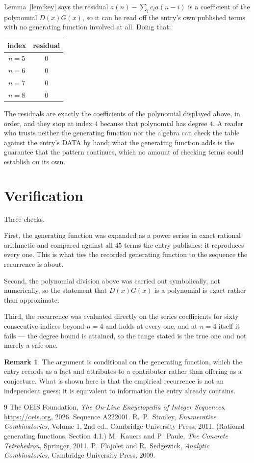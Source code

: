 \documentclass[11pt,a4paper]{article}
\theoremstyle{plain}
\theoremstyle{definition}
\newtheorem{remark}[theorem]{Remark}
\begin{document}
Lemma~\ref{lem:key} says the residual $a(n)-\sum_ic_ia(n-i)$ is a coefficient of the
polynomial $D(x)G(x)$, so it can be read off the entry's own published terms with no
generating function involved at all. Doing that:
\begin{center}
\begin{tabular}{cc}
index & residual \\ \hline
$n=5$ & $0$ \\
$n=6$ & $0$ \\
$n=7$ & $0$ \\
$n=8$ & $0$
\end{tabular}
\end{center}
The residuals are exactly the coefficients of the polynomial displayed above, in order, and
they stop at index $4$ because that polynomial has degree $4$. A reader who trusts
neither the generating function nor the algebra can check the table against the entry's DATA
by hand; what the generating function adds is the guarantee that the pattern continues, which
no amount of checking terms could establish on its own.

\section{Verification}

Three checks.

First, the generating function was expanded as a power series in exact rational arithmetic and
compared against all $45$ terms the entry publishes: it reproduces every one. This is
what ties the recorded generating function to the sequence the recurrence is about.

Second, the polynomial division above was carried out symbolically, not numerically, so the
statement that $D(x)G(x)$ is a polynomial is exact rather than approximate.

Third, the recurrence was evaluated directly on the series coefficients for sixty consecutive
indices beyond $n=4$ and holds at every one, and at $n=4$ itself it fails --- the
degree bound is attained, so the range stated is the true one and not merely a safe one.

\begin{remark}
The argument is conditional on the generating function, which the entry records as a fact and
attributes to a contributor rather than offering as a conjecture. What is shown here is that
the empirical recurrence is not an independent guess: it is equivalent to information the
entry already contains.
\end{remark}

\begin{thebibliography}{9}
 The OEIS Foundation, \emph{The On-Line Encyclopedia of Integer
Sequences}, \url{https://oeis.org}, 2026. Sequence A222001.
 R.~P.~Stanley, \emph{Enumerative Combinatorics}, Volume 1, 2nd ed.,
Cambridge University Press, 2011. (Rational generating functions, Section 4.1.)
 M.~Kauers and P.~Paule, \emph{The Concrete Tetrahedron}, Springer, 2011.
 P.~Flajolet and R.~Sedgewick, \emph{Analytic Combinatorics}, Cambridge
University Press, 2009.
\end{thebibliography}
\end{document}
